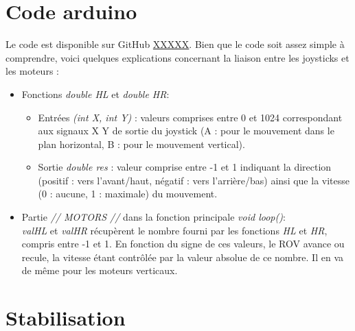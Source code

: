 \documentclass[11pt,a4paper]{article}
\begin{document}
      \section{Code arduino}
        Le code est disponible sur GitHub \url{XXXXX}. Bien que le code soit assez simple à comprendre, voici quelques explications concernant la liaison entre les joysticks et les moteurs :
        \begin{itemize}
          \item Fonctions \emph{double HL} et \emph{double HR}:
            \begin{itemize}
              \item Entrées \emph{(int X, int Y)} : valeurs comprises entre 0 et 1024 correspondant aux signaux X Y de sortie du joystick (A : pour le mouvement dans le plan horizontal, B : pour le mouvement vertical).
              \item Sortie  \emph{double res} : valeur comprise entre -1 et 1 indiquant la direction (positif : vers l'avant/haut, négatif : vers l'arrière/bas) ainsi que la vitesse (0 : aucune, 1 : maximale) du mouvement.
            \end{itemize}
            \item Partie \emph{// MOTORS //} dans la fonction principale \emph{void loop()}:\\ \emph{valHL} et \emph{valHR} récupèrent le nombre fourni par les fonctions \emph{HL} et \emph{HR}, compris entre -1 et 1. En fonction du signe de ces valeurs, le ROV avance ou recule, la vitesse étant contrôlée par la valeur absolue de ce nombre. Il en va de même pour les moteurs verticaux.
        \end{itemize}

    \section{Stabilisation}
      
\end{document}
